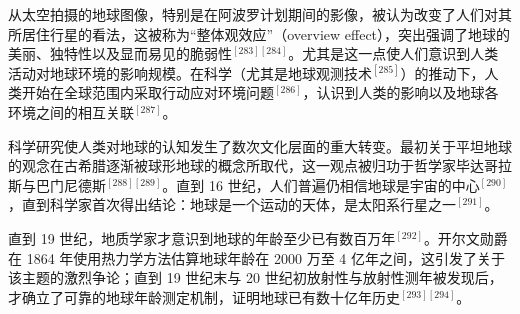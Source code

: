 从太空拍摄的地球图像，特别是在阿波罗计划期间的影像，被认为改变了人们对其所居住行星的看法，这被称为“整体观效应”（overview effect），突出强调了地球的美丽、独特性以及显而易见的脆弱性$^{[283][284]}$。尤其是这一点使人们意识到人类活动对地球环境的影响规模。在科学（尤其是地球观测技术$^{[285]}$）的推动下，人类开始在全球范围内采取行动应对环境问题$^{[286]}$，认识到人类的影响以及地球各环境之间的相互关联$^{[287]}$。

科学研究使人类对地球的认知发生了数次文化层面的重大转变。最初关于平坦地球的观念在古希腊逐渐被球形地球的概念所取代，这一观点被归功于哲学家毕达哥拉斯与巴门尼德斯$^{[288][289]}$。直到 16 世纪，人们普遍仍相信地球是宇宙的中心$^{[290]}$，直到科学家首次得出结论：地球是一个运动的天体，是太阳系行星之一$^{[291]}$。

直到 19 世纪，地质学家才意识到地球的年龄至少已有数百万年$^{[292]}$。开尔文勋爵在 1864 年使用热力学方法估算地球年龄在 2000 万至 4 亿年之间，这引发了关于该主题的激烈争论；直到 19 世纪末与 20 世纪初放射性与放射性测年被发现后，才确立了可靠的地球年龄测定机制，证明地球已有数十亿年历史$^{[293][294]}$。

